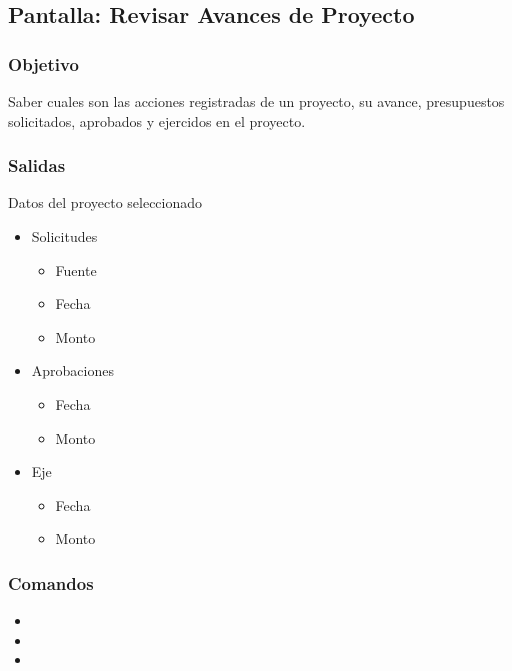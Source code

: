 \subsection{Pantalla: Revisar Avances de Proyecto}
\subsubsection{Objetivo}
Saber cuales son las acciones registradas de un proyecto, su avance, presupuestos solicitados, aprobados y ejercidos en el proyecto. %

\subsubsection{Salidas}
Datos del proyecto seleccionado %
\begin{itemize}
\item Solicitudes
	\begin{itemize}
		\item Fuente
		\item Fecha
		\item Monto
	\end{itemize}
\item Aprobaciones
	\begin{itemize}
		\item Fecha
		\item Monto
	\end{itemize}
\item Eje
	\begin{itemize}
		\item Fecha
		\item Monto
	\end{itemize}
\end{itemize}

\subsubsection{Comandos}
\begin{itemize}
 \item {} 
 \item {}
 \item {}

\end{itemize}


